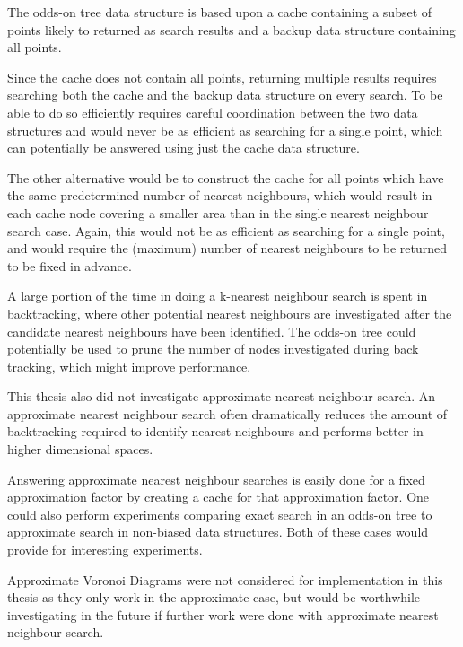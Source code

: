 \documentclass[mcs]{scsthesis}
\begin{document}
The odds-on tree data structure is based upon a cache containing a subset of
points likely to returned as search results and a backup data structure 
containing all points.

Since the cache does not contain all points, returning multiple results requires
searching both the cache and the backup data structure on every search. To be
able to do so efficiently requires careful coordination between the two data
structures and would never be as efficient as searching for a single point,
which can potentially be answered using just the cache data structure.

The other alternative would be to construct the cache for all points which have
the same predetermined number of nearest neighbours, which would result in each
cache node covering a smaller area than in the single nearest neighbour search 
case. Again, this would not be as efficient as searching for a single point, and
would require the (maximum) number of nearest neighbours to be returned to be
fixed in advance.

A large portion of the time in doing a k-nearest neighbour search is spent in
backtracking, where other potential nearest neighbours are investigated after
the candidate nearest neighbours have been identified. The odds-on tree could
potentially be used to prune the number of nodes investigated during back
tracking, which might improve performance.

This thesis also did not investigate approximate nearest neighbour search. An
approximate nearest neighbour search often dramatically reduces the amount of
backtracking required to identify nearest neighbours and performs better in
higher dimensional spaces.

Answering approximate nearest neighbour searches is easily done for a fixed
approximation factor by creating a cache for that approximation factor. One
could also perform experiments comparing exact search in an odds-on tree to 
approximate search in non-biased data structures. Both of these cases would
provide for interesting experiments.

Approximate Voronoi Diagrams \cite{avd} were not considered for implementation
in this thesis as they only work in the approximate case, but would be
worthwhile investigating in the future if further work were done with
approximate nearest neighbour search.
\end{document}
